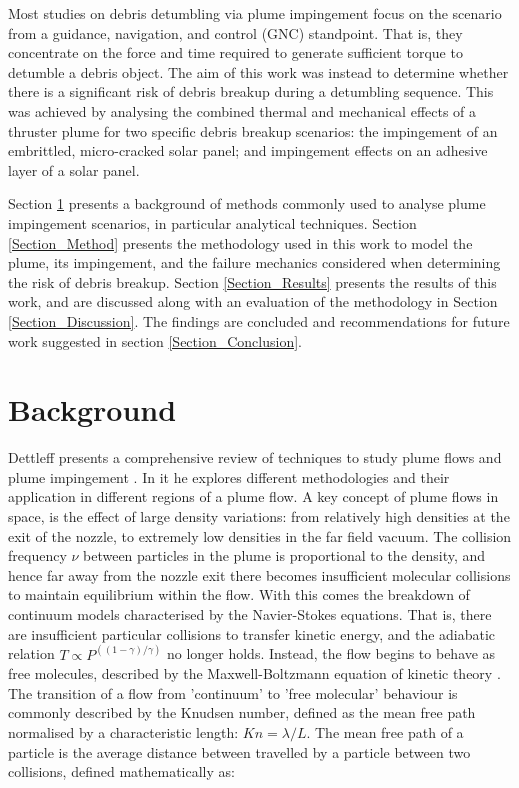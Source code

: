 \documentclass[journal]{new-aiaa}
\begin{document}
Most studies on debris detumbling via plume impingement focus on the scenario from a guidance, navigation, and control (GNC) standpoint. That is, they concentrate on the force and time required to generate sufficient torque to detumble a debris object. The aim of this work was instead to determine whether there is a significant risk of debris breakup during a detumbling sequence. This was achieved by analysing the combined thermal and mechanical effects of a thruster plume for two specific debris breakup scenarios: the impingement of an embrittled, micro-cracked solar panel; and impingement effects on an adhesive layer of a solar panel.


Section \ref{Section_Background} presents a background of methods commonly used to analyse plume impingement scenarios, in particular analytical techniques. Section \ref{Section_Method} presents the methodology used in this work to model the plume, its impingement, and the failure mechanics considered when determining the risk of debris breakup. Section \ref{Section_Results} presents the results of this work, and are discussed along with an evaluation of the methodology in Section \ref{Section_Discussion}. The findings are concluded and recommendations for future work suggested in section \ref{Section_Conclusion}.

\section{Background}
\label{Section_Background}



Dettleff presents a comprehensive review of techniques to study plume flows and plume impingement \cite{dettleffPlumeFlowPlume1991}. In it he explores different methodologies and their application in different regions of a plume flow. A key concept of plume flows in space, is the effect of large density variations: from relatively high densities at the exit of the nozzle, to extremely low densities in the far field vacuum. The collision frequency $\nu$ between particles in the plume is proportional to the density, and hence far away from the nozzle exit there becomes insufficient molecular collisions to maintain equilibrium within the flow. With this comes the breakdown of continuum models characterised by the Navier-Stokes equations. That is, there are insufficient particular collisions to transfer kinetic energy, and the adiabatic relation $T \propto P^{((1-\gamma)/ \gamma)}$ no longer holds. Instead, the flow begins to behave as free molecules, described by the Maxwell-Boltzmann equation of kinetic theory \cite{pittPlumeImpingementStudies2022}. The transition of a flow from 'continuum' to 'free molecular' behaviour is commonly described by the Knudsen number, defined as the mean free path normalised by a characteristic length: $Kn = \lambda/L$. The mean free path of a particle is the average distance between travelled by a particle between two collisions, defined mathematically as:
\end{document}
